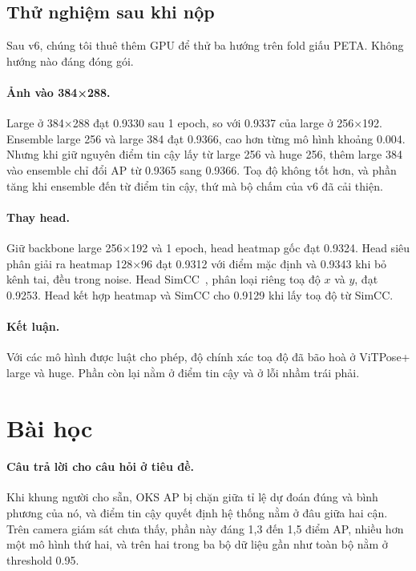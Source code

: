\documentclass[11pt,a4paper]{article}
\begin{document}
\subsection{Thử nghiệm sau khi nộp}
\label{sec:extra}

Sau v6, chúng tôi thuê thêm GPU để thử ba hướng trên fold giấu PETA. Không hướng nào đáng đóng gói.

\paragraph{Ảnh vào 384×288.} Large ở 384×288 đạt 0.9330 sau 1 epoch, so với 0.9337 của large ở 256×192. Ensemble large 256 và large 384 đạt 0.9366, cao hơn từng mô hình khoảng 0.004. Nhưng khi giữ nguyên điểm tin cậy lấy từ large 256 và huge 256, thêm large 384 vào ensemble chỉ đổi AP từ 0.9365 sang 0.9366. Toạ độ không tốt hơn, và phần tăng khi ensemble đến từ điểm tin cậy, thứ mà bộ chấm của v6 đã cải thiện.

\paragraph{Thay head.} Giữ backbone large 256×192 và 1 epoch, head heatmap gốc đạt 0.9324. Head siêu phân giải ra heatmap 128×96 đạt 0.9312 với điểm mặc định và 0.9343 khi bỏ kênh tai, đều trong noise. Head SimCC~\cite{simcc}, phân loại riêng toạ độ $x$ và $y$, đạt 0.9253. Head kết hợp heatmap và SimCC cho 0.9129 khi lấy toạ độ từ SimCC.

\paragraph{Kết luận.} Với các mô hình được luật cho phép, độ chính xác toạ độ đã bão hoà ở ViTPose+ large và huge. Phần còn lại nằm ở điểm tin cậy và ở lỗi nhầm trái phải.

\section{Bài học}
\label{sec:lessons}

\paragraph{Câu trả lời cho câu hỏi ở tiêu đề.} Khi khung người cho sẵn, OKS AP bị chặn giữa tỉ lệ dự đoán đúng và bình phương của nó, và điểm tin cậy quyết định hệ thống nằm ở đâu giữa hai cận. Trên camera giám sát chưa thấy, phần này đáng 1,3 đến 1,5 điểm AP, nhiều hơn một mô hình thứ hai, và trên hai trong ba bộ dữ liệu gần như toàn bộ nằm ở threshold 0.95.
\end{document}
